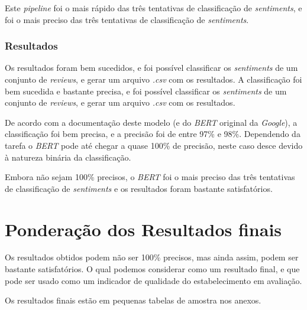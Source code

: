 Este \textit{pipeline} foi o mais rápido das três tentativas de classificação de \textit{sentiments}, e foi o mais preciso das três tentativas de classificação de \textit{sentiments}.

\subsubsection{Resultados}

Os resultados foram bem sucedidos, e foi possível classificar os \textit{sentiments} de um conjunto de \textit{reviews}, e gerar um arquivo \textit{.csv} com os resultados. A classificação foi bem sucedida e bastante precisa, e foi possível classificar os \textit{sentiments} de um conjunto de \textit{reviews}, e gerar um arquivo \textit{.csv} com os resultados.

De acordo com a documentação deste modelo (e do \textit{BERT} original da \textit{Google}), a classificação foi bem precisa, e a precisão foi de entre 97\% e 98\%. Dependendo da tarefa o \textit{BERT} pode até chegar a quase 100\% de precisão, neste caso desce devido à natureza binária da classificação.

Embora não sejam 100\% precisos, o \textit{BERT} foi o mais preciso das três tentativas de classificação de \textit{sentiments} e os resultados foram bastante satisfatórios.

\section{Ponderação dos Resultados finais}

Os resultados obtidos podem não ser 100\% precisos, mas ainda assim, podem ser bastante satisfatórios. O qual podemos considerar como um resultado final, e que pode ser usado como um indicador de qualidade do estabelecimento em avaliação.

Os resultados finais estão em pequenas tabelas de amostra nos anexos.